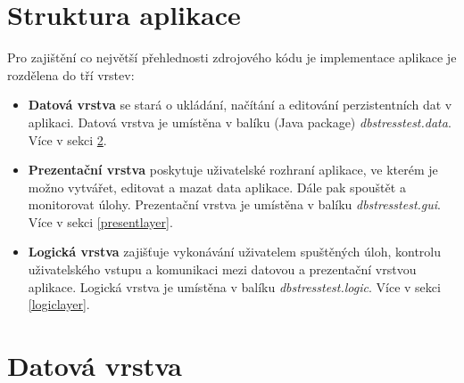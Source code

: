\documentclass[czech,bachelor,public,dept460,male,cpdeclaration,twoside]{diploma}
\begin{document}
\section{Struktura aplikace}
Pro zajištění co největší přehlednosti zdrojového kódu je implementace aplikace je rozdělena do tří vrstev:
\begin{itemize}
  	\item \textbf{Datová vrstva} se stará o ukládání, načítání a editování perzistentních dat v aplikaci. Datová vrstva je umístěna v balíku (Java package) \textit{dbstresstest.data}. Více v sekci \ref{datalayer}.
  	\item \textbf{Prezentační vrstva} poskytuje uživatelské rozhraní aplikace, ve kterém je možno vytvářet, editovat a mazat data aplikace. Dále pak spouštět a monitorovat úlohy. Prezentační vrstva je umístěna v balíku \textit{dbstresstest.gui}. Více v sekci \ref{presentlayer}.
  	\item \textbf{Logická vrstva} zajišťuje vykonávání uživatelem spuštěných úloh, kontrolu uživatelského vstupu a komunikaci mezi datovou a prezentační vrstvou aplikace. Logická vrstva je umístěna v balíku \textit{dbstresstest.logic}. Více v sekci \ref{logiclayer}.
\end{itemize}  	
\newpage
\section{Datová vrstva} \label{datalayer}
\end{document}
